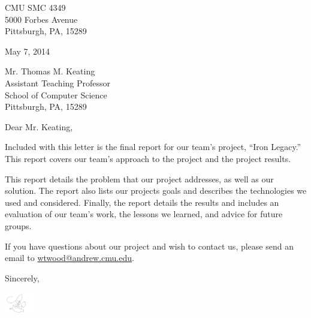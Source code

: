 \documentclass{article}
\begin{document}
\thispagestyle{empty}
\noindent
CMU SMC 4349\\
5000 Forbes Avenue\\
Pittsburgh, PA, 15289

\vspace{2em}

\noindent
May 7, 2014

\vspace{2em}

\noindent
Mr. Thomas M. Keating\\
Assistant Teaching Professor\\
School of Computer Science\\
Pittsburgh, PA, 15289

\vspace{2em}

\noindent
Dear Mr. Keating,

\vspace{2em}

\noindent
Included with this letter is the final report for our team's project,
    ``Iron Legacy.''
     This report covers our team's approach to the project and the project
     results.

\vspace{2em}

\noindent
This report details the problem that our project addresses, 
    as well as our solution.
    The report also lists our projects goals
    and describes the technologies we used and considered.
    Finally, the report details the results and includes an evaluation of our
    team's work, the lessons we learned, and advice for future groups.

\vspace{2em}

\noindent
If you have questions about our project and wish to contact us,
    please send an email to \url{wtwood@andrew.cmu.edu}.

\vspace{2em}

\noindent
Sincerely,

\vspace{1em}

\noindent
\includegraphics[height=2.5em]{Signature.png}

\vspace{0.5em}
\end{document}
